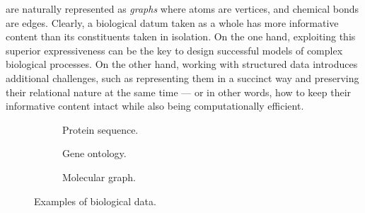 are naturally represented as \emph{graphs} where atoms are vertices, and chemical bonds are edges. Clearly, a biological datum taken as a whole has more informative content than its constituents taken in isolation. On the one hand, exploiting this superior expressiveness can be the key to design successful models of complex biological processes. On the other hand, working with structured data introduces additional challenges, such as representing them in a succinct way and preserving their relational nature at the same time --- or in other words, how to keep their informative content intact while also being computationally efficient.
\begin{figure*}[h!]
    \begin{subfigure}[b]{0.32\linewidth}
        \centering
        \resizebox{.9\textwidth}{!}{}
        \caption{Protein sequence.}
        \label{subfig:protein-sequence}
    \end{subfigure}
    \begin{subfigure}[b]{0.36\linewidth}
        \centering
        \resizebox{.9\textwidth}{!}{}
        \caption{Gene ontology.}
        \label{subfig:gene-ontology}
    \end{subfigure}
    \begin{subfigure}[b]{0.28\linewidth}
        \centering
        \resizebox{.7\textwidth}{!}{}
        \caption{Molecular graph.}
        \label{subfig:molecular-graph}
    \end{subfigure}
    \caption{Examples of biological data.}\label{fig:biological-data}
\end{figure*}
